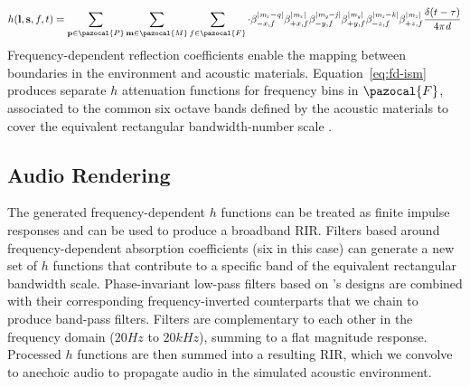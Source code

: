 \begin{equation}\label{eq:fd-ism}    
 h(\mathbf{l}, \mathbf{s}, f, t) = \sum_{\mathbf{p} \in \pazocal{P}} \sum_{\mathbf{m} \in \pazocal{M}} \sum_{f \in \pazocal{F}}\cdot
\beta_{ {-x,f } }^{|\mathit{m_x - q}|} \beta_{+x, f }^{|\mathit{m_x}|} \beta_{ -y,f}^{|\mathit{m_y - j}|} \beta_{ +y, f }^{|\mathit{m_y}|} \beta_{ -z, f }^{|\mathit{m_z - k}|} \beta_{ +z, f }^{|\mathit{m_z}|} \frac{\delta(t - \tau)}{4\pi \mathit{d}}
\end{equation}
Frequency-dependent reflection coefficients enable the mapping between boundaries in the environment and acoustic materials. Equation~\ref{eq:fd-ism} produces separate $h$ attenuation functions for frequency bins in $\pazocal{F}$, associated to the common six octave bands defined by the acoustic materials to cover the equivalent rectangular bandwidth-number scale \citep{kuttruff2016room, savioja2015overview}.

\subsection{Audio Rendering}
The generated frequency-dependent $h$ functions can be treated as finite impulse responses and can be used to produce a broadband RIR. Filters based around frequency-dependent absorption coefficients (six in this case) can generate a new set of $h$ functions that contribute to a specific band of the equivalent rectangular bandwidth scale. Phase-invariant low-pass filters based on \citep{smith1997scientist}'s designs are combined with their corresponding frequency-inverted counterparts that we chain to produce band-pass filters. Filters are complementary to each other in the frequency domain ($20Hz$ to $20kHz$), summing to a flat magnitude response. Processed $h$ functions are then summed into a resulting RIR, which we convolve to anechoic audio to propagate audio in the simulated acoustic environment. \par

